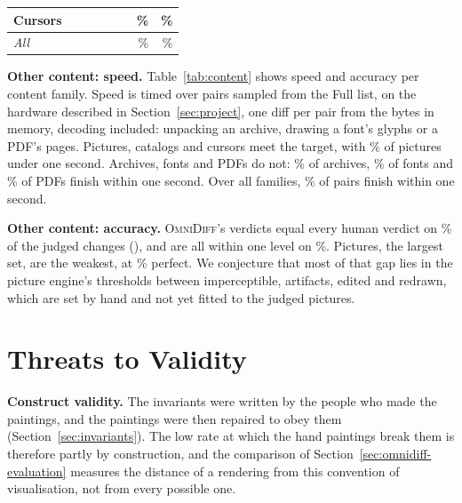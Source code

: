 \documentclass[sigconf,review]{acmart}
\begin{document}
\begin{table}
\begin{tabular}{@{}lrrrrrrr@{}}
    Cursors & \ContentSpeedCursorsPairs{} & \ContentSpeedCursorsPFifty{} & \ContentSpeedCursorsPNinety{} & \ContentSpeedCursorsPNinetyNine{} & \ContentAccCursorsJudged{} & \ContentAccCursorsPerfectPct{}\% & \ContentAccCursorsNearPerfectPct{}\% \\
    \midrule
    \emph{All} & \ContentSpeedPairs{} & \ContentSpeedPFifty{} & & & \ContentAccAllJudged{} & \ContentAccAllPerfectPct{}\% & \ContentAccAllNearPerfectPct{}\% \\
    \bottomrule
  \end{tabular}
\end{table}

\textbf{Other content: speed.} Table~\ref{tab:content} shows speed and accuracy per content
family. Speed is timed over \ContentSpeedPairs{} pairs sampled from the Full list, on the hardware
described in Section~\ref{sec:project}, one diff per pair from the bytes in memory, decoding included:
unpacking an archive, drawing a font's glyphs or a PDF's pages. Pictures, catalogs and cursors meet
the target, with \ContentSpeedPicturesUnderSecondPct{}\% of pictures under one second.
Archives, fonts and PDFs do not: \ContentSpeedArchivesUnderSecondPct{}\% of archives,
\ContentSpeedFontsUnderSecondPct{}\% of fonts and \ContentSpeedPdfsUnderSecondPct{}\% of PDFs
finish within one second. Over all families, \ContentSpeedUnderSecondPct{}\% of pairs finish
within one second.

\textbf{Other content: accuracy.} \textsc{OmniDiff}'s verdicts equal every human verdict on
\ContentAccAllPerfectPct{}\% of the \ContentAccAllJudged{} judged changes
(\ContentAccAllPerfect{}), and are all within one level on \ContentAccAllNearPerfectPct{}\%.
Pictures, the largest set, are the weakest, at \ContentAccPicturesPerfectPct{}\% perfect. We
conjecture that most of that gap lies in the picture engine's thresholds between imperceptible,
artifacts, edited and redrawn, which are set by hand and not yet fitted to the judged pictures.

\section{Threats to Validity}
\label{sec:threats}

\textbf{Construct validity.} The invariants were written by the people who made the paintings,
and the paintings were then repaired to obey them (Section~\ref{sec:invariants}). The low rate
at which the hand paintings break them is therefore partly by construction, and the comparison
of Section~\ref{sec:omnidiff-evaluation} measures the distance of a rendering from this convention
of visualisation, not from every possible one.
\end{document}
